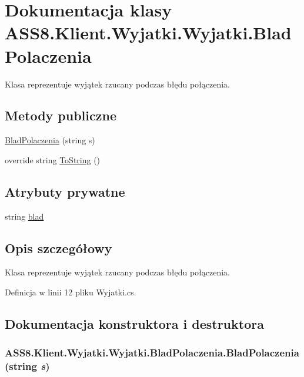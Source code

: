\hypertarget{a00034}{
\section{Dokumentacja klasy ASS8.Klient.Wyjatki.Wyjatki.BladPolaczenia}
\label{db/df3/a00034}
}
Klasa reprezentuje wyjątek rzucany podczas błędu połączenia.  


\subsection*{Metody publiczne}
\begin{CompactItemize}
\item 
\hyperlink{a00034_7515a77578b76abebe15152d2a636756}{BladPolaczenia} (string s)
\item 
override string \hyperlink{a00034_9b0fb66ce46934d7a501fb8f49969a92}{ToString} ()
\end{CompactItemize}
\subsection*{Atrybuty prywatne}
\begin{CompactItemize}
\item 
string \hyperlink{a00034_f32d7702691c3151506e46e516d471b9}{blad}
\end{CompactItemize}


\subsection{Opis szczegółowy}
Klasa reprezentuje wyjątek rzucany podczas błędu połączenia. 



Definicja w linii 12 pliku Wyjatki.cs.

\subsection{Dokumentacja konstruktora i destruktora}
\hypertarget{a00034_7515a77578b76abebe15152d2a636756}{
\subsubsection[{BladPolaczenia}]{\setlength{\rightskip}{0pt plus 5cm}ASS8.Klient.Wyjatki.Wyjatki.BladPolaczenia.BladPolaczenia (string {\em s})}}
\label{db/df3/a00034_7515a77578b76abebe15152d2a636756}




